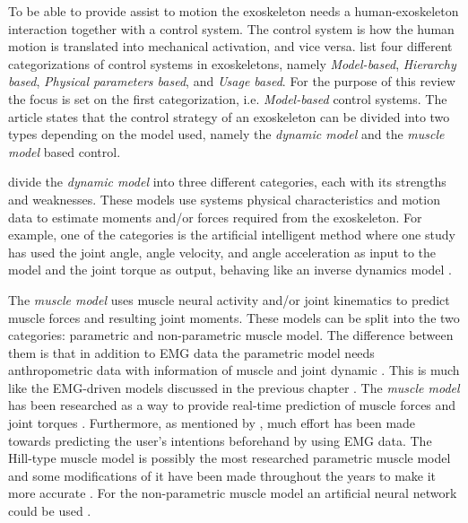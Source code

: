To be able to provide assist to motion the exoskeleton needs a human-exoskeleton interaction together with a control system. 
The control system is how the human motion is translated into mechanical activation, and vice versa. 
 list four different categorizations of control systems in exoskeletons, namely \textit{Model-based}, \textit{Hierarchy based}, \textit{Physical parameters based}, and \textit{Usage based}. 
For the purpose of this review the focus is set on the first categorization, i.e. \textit{Model-based} control systems.
The article states that the control strategy of an exoskeleton can be divided into two types depending on the model used, namely the \textit{dynamic model} and the \textit{muscle model} based control. 

\citeauthor{Anam2012} divide the \textit{dynamic model} into three different categories, each with its strengths and weaknesses.
These models use systems physical characteristics and motion data to estimate moments and/or forces required from the exoskeleton. 
For example, one of the categories is the artificial intelligent method where one study has used the joint angle, angle velocity, and angle acceleration as input to the model and the joint torque as output, behaving like an inverse dynamics model \cite{Anam2012}.

The \textit{muscle model} uses muscle neural activity and/or joint kinematics to predict muscle forces and resulting joint moments. These models can be split into the two categories: parametric and non-parametric muscle model. 
The difference between them is that in addition to \ac{EMG} data the parametric model needs anthropometric data with information of muscle and joint dynamic \cite{Anam2012}.
This is much like the \ac{EMG}-driven models discussed in the previous chapter \cite{Pizzolato2015}.
The \textit{muscle model} has been researched as a way to provide real-time prediction of muscle forces and joint torques \cite{Anam2012, durandau, Pizzolato2015}. 
Furthermore, as mentioned by , much effort has been made towards predicting the user's intentions beforehand by using \ac{EMG} data.
The Hill-type muscle model is possibly the most researched parametric muscle model and some modifications of it have been made throughout the years to make it more accurate \cite{Lloyd2003, Anam2012, Pizzolato2015, Lee14-1}.
For the non-parametric muscle model an artificial neural network could be used \cite{Kiguchi2012,Lee14-1}.  

